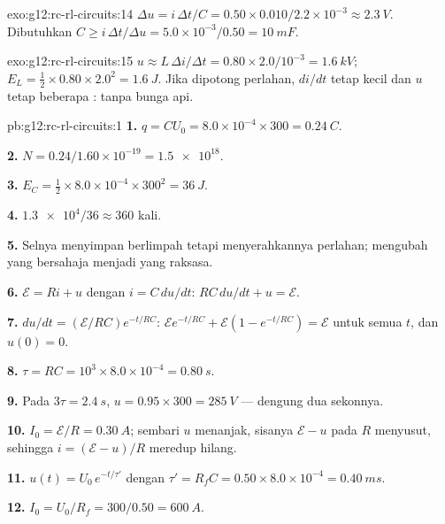 \begin{solution}{exo:g12:rc-rl-circuits:14}
$\Delta u = i\,\Delta t/C = 0.50 \times 0.010/2.2\times10^{-3} \approx
\qty{2.3}{V}$. Dibutuhkan $C \geq i\,\Delta t/\Delta u =
5.0\times10^{-3}/0.50 = \qty{10}{mF}$.
\end{solution}

\begin{solution}{exo:g12:rc-rl-circuits:15}
$u \approx L\,\Delta i/\Delta t = 0.80 \times 2.0/10^{-3} =
\qty{1.6}{kV}$; $E_L = \tfrac12 \times 0.80 \times 2.0^2 =
\qty{1.6}{J}$. Jika dipotong perlahan, $di/dt$ tetap kecil dan $u$ tetap beberapa :
tanpa bunga api.
\end{solution}

\begin{solution}{pb:g12:rc-rl-circuits:1}
\textbf{1.} $q = CU_0 = 8.0\times10^{-4} \times 300 = \qty{0.24}{C}$.

\textbf{2.} $N = 0.24/1.60\times10^{-19} = \num{1.5e18}$.

\textbf{3.} $E_C = \tfrac12 \times 8.0\times10^{-4} \times 300^2 =
\qty{36}{J}$.

\textbf{4.} $\num{1.3e4}/36 \approx 360$ kali.

\textbf{5.} Selnya menyimpan berlimpah tetapi menyerahkannya perlahan; 
mengubah  yang bersahaja menjadi \emph{} yang raksasa.

\textbf{6.} $\mathcal{E} = Ri + u$ dengan $i = C\,du/dt$:
$RC\,du/dt + u = \mathcal{E}$.

\textbf{7.} $du/dt = (\mathcal{E}/RC)e^{-t/RC}$:
$\mathcal{E}e^{-t/RC} + \mathcal{E}(1 - e^{-t/RC}) = \mathcal{E}$
untuk semua $t$, dan $u(0) = 0$.

\textbf{8.} $\tau = RC = 10^3 \times 8.0\times10^{-4} = \qty{0.80}{s}$.

\textbf{9.} Pada $3\tau = \qty{2.4}{s}$, $u = 0.95 \times 300 =
\qty{285}{V}$ --- dengung dua sekonnya.

\textbf{10.} $I_0 = \mathcal{E}/R = \qty{0.30}{A}$; sembari $u$ menanjak,
sisanya $\mathcal{E} - u$ pada $R$ menyusut, sehingga $i = (\mathcal{E}-u)/R$
meredup hilang.

\textbf{11.} $u(t) = U_0\,e^{-t/\tau'}$ dengan $\tau' = R_f C =
0.50 \times 8.0\times10^{-4} = \qty{0.40}{ms}$.

\textbf{12.} $I_0 = U_0/R_f = 300/0.50 = \qty{600}{A}$.


\end{solution}
